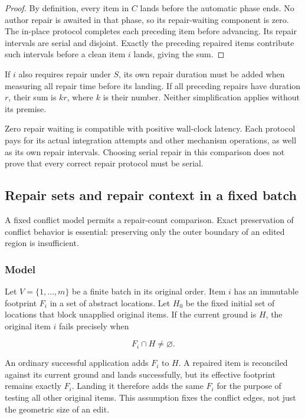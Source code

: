 \documentclass[pdflatex,sn-mathphys-ay]{sn-jnl}
\theoremstyle{thmstyleone}
\theoremstyle{thmstylethree}
\begin{document}
\begin{appendices}
\begin{proof}
By definition, every item in \(C\) lands before the automatic phase ends. No author repair is awaited in that phase, so its repair-waiting component is zero. The in-place protocol completes each preceding item before advancing. Its repair intervals are serial and disjoint. Exactly the preceding repaired items contribute such intervals before a clean item \(i\) lands, giving the sum.

\end{proof}

If \(i\) also requires repair under \(S\), its own repair duration must be added when measuring all repair time before its landing. If all preceding repairs have duration \(r\), their sum is \(kr\), where \(k\) is their number. Neither simplification applies without its premise.

Zero repair waiting is compatible with positive wall-clock latency. Each protocol pays for its actual integration attempts and other mechanism operations, as well as its own repair intervals. Choosing serial repair in this comparison does not prove that every correct repair protocol must be serial.

\subsection{Repair sets and repair context in a fixed batch}\label{app:repair-sets}

A fixed conflict model permits a repair-count comparison. Exact preservation of conflict behavior is essential: preserving only the outer boundary of an edited region is insufficient.

\subsubsection{Model}\label{app:batch-model}

Let \(V=\{1,\ldots,m\}\) be a finite batch in its original order. Item \(i\) has an immutable footprint \(F_i\) in a set of abstract locations. Let \(H_0\) be the fixed initial set of locations that block unapplied original items. If the current ground is \(H\), the original item \(i\) fails precisely when

\[
F_i\cap H\ne\varnothing.
\]

An ordinary successful application adds \(F_i\) to \(H\). A repaired item is reconciled against its current ground and lands successfully, but its effective footprint remains exactly \(F_i\). Landing it therefore adds the same \(F_i\) for the purpose of testing all other original items. This assumption fixes the conflict edges, not just the geometric size of an edit.


\end{appendices}
\end{document}

